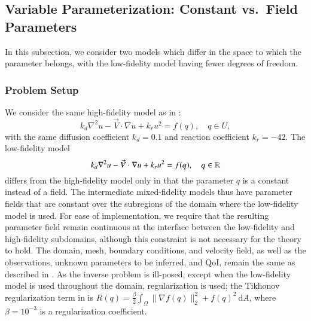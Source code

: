 \subsection{Variable Parameterization: Constant vs.\ Field Parameters} \label{sec:constvfield}

In this subsection, we consider two models which differ in the space to which the parameter belongs, with the low-fidelity model having fewer degrees of freedom. 

\subsubsection{Problem Setup}

We consider the same high-fidelity model as in :
\begin{equation}
k_d\nabla^2 u - \vec{V}\cdot\nabla u + k_ru^2= f(q),\quad q\in U,
\end{equation}
with the same diffusion coefficient $k_d = 0.1$  and reaction coefficient $k_r = -42$. The low-fidelity model
\begin{equation}
k_d\nabla^2 u - \vec{V}\cdot\nabla u + k_ru^2= f(q),\quad q\in{\mathbb{R}}
\end{equation}
differs from the high-fidelity model only in that the parameter $q$ is a constant instead of a field. The intermediate mixed-fidelity models thus have parameter fields that are constant over the subregions of the domain where the low-fidelity model is used. For ease of implementation, we require that the resulting parameter field remain continuous at the interface between the low-fidelity and high-fidelity subdomains, although this constraint is not necessary for the theory to hold. The domain, mesh, boundary conditions, and velocity field, as well as the observations, unknown parameters to be inferred, and QoI, remain the same as described in . As the inverse problem is ill-posed, except when the low-fidelity model is used throughout the domain, regularization is used; the Tikhonov regularization term in  is $R(q)=\frac{\beta}{2}\int_\Omega \|\nabla f(q)\|_2^2+f(q)^2\:\textrm{d}A$, where $\beta=10^{-3}$ is a regularization coefficient. 

